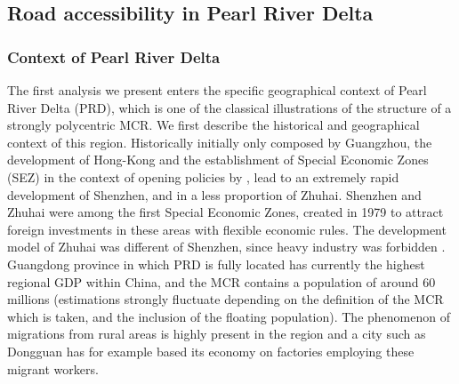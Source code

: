 \subsection{Road accessibility in Pearl River Delta}

\subsubsection{Context of Pearl River Delta}

The first analysis we present enters the specific geographical context of Pearl River Delta (PRD), which is one of the classical illustrations of the structure of a strongly polycentric MCR. We first describe the historical and geographical context of this region. Historically initially only composed by Guangzhou, the development of Hong-Kong and the establishment of Special Economic Zones (SEZ) in the context of opening policies by , lead to an extremely rapid development of Shenzhen, and in a less proportion of Zhuhai. Shenzhen and Zhuhai were among the first Special Economic Zones, created in 1979 to attract foreign investments in these areas with flexible economic rules. The development model of Zhuhai was different of Shenzhen, since heavy industry was forbidden . Guangdong province in which PRD is fully located has currently the highest regional GDP within China, and the MCR contains a population of around 60 millions (estimations strongly fluctuate depending on the definition of the MCR which is taken, and the inclusion of the floating population). The phenomenon of migrations from rural areas is highly present in the region and a city such as Dongguan has for example based its economy on factories employing these migrant workers.


